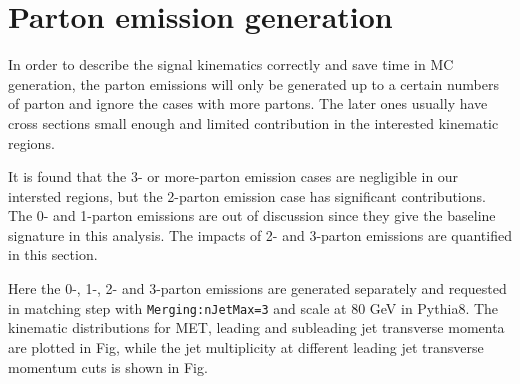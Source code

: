 \section{Parton emission generation}
\label{sec:monojet_parton_emission}
In order to describe the signal kinematics correctly and save time in MC generation, the parton emissions will only be generated up to a certain numbers of parton and ignore the cases with more partons. The later ones usually have cross sections small enough and limited contribution in the interested kinematic regions.

It is found that the 3- or more-parton emission cases are negligible in our intersted regions, but the 2-parton emission case has significant contributions. The 0- and 1-parton emissions are out of discussion since they give the baseline signature in this analysis. The impacts of 2- and 3-parton emissions are quantified in this section.

Here the 0-, 1-, 2- and 3-parton emissions are generated separately and requested in matching step with \texttt{Merging:nJetMax=3} and scale at 80 GeV in Pythia8. The kinematic distributions for MET, leading and subleading jet transverse momenta are plotted in Fig, while the jet multiplicity at different leading jet transverse momentum cuts is shown in Fig.

